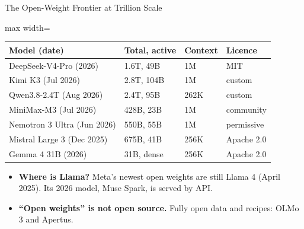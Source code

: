 \begin{frame}{The Open-Weight Frontier at Trillion Scale}
    \begin{center}
    \footnotesize
    \renewcommand{\arraystretch}{1.1}
    \setlength{\tabcolsep}{6pt}\begin{adjustbox}{max width=\linewidth}\begin{tabular}{llll}
        \toprule
        \textbf{Model (date)} & \textbf{Total, active} & \textbf{Context} & \textbf{Licence} \\
        \midrule
        DeepSeek-V4-Pro (2026) & 1.6T, 49B & 1M & MIT \\
        Kimi K3 (Jul 2026) & 2.8T, 104B & 1M & custom \\
        Qwen3.8-2.4T (Aug 2026) & 2.4T, 95B & 262K & custom \\
        MiniMax-M3 (Jul 2026) & 428B, 23B & 1M & community \\
        Nemotron 3 Ultra (Jun 2026) & 550B, 55B & 1M & permissive \\
        Mistral Large 3 (Dec 2025) & 675B, 41B & 256K & Apache 2.0 \\
        Gemma 4 31B (2026) & 31B, dense & 256K & Apache 2.0 \\
        \bottomrule
    \end{tabular}\end{adjustbox}
    \end{center}
    \begin{itemize}\itemsep0.35em
        \item \textbf{Where is Llama?} Meta's newest open weights are still Llama 4 (April 2025). Its 2026 model, Muse Spark, is served by API.
        \item \textbf{``Open weights'' is not open source.} Fully open data and recipes: OLMo 3 and Apertus.
    \end{itemize}
\end{frame}

